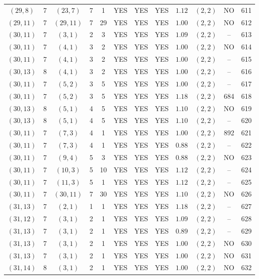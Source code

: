 \begin{longtable}{|c|c|c|c|c|c|c|c|c|c|c|c|}
$(29,8)$ & 7 & $(23,7)$ & 7 & 1 & YES & YES & YES & $1.12$ & $(2,2)$ & NO & 611\\
$(29,11)$ & 7 & $(29,11)$ & 7 & 29 & YES & YES & YES & $1.00$ & $(2,2)$ & NO & 612\\
$(30,11)$ & 7 & $(3,1)$ & 2 & 3 & YES & YES & YES & $1.09$ & $(2,2)$ & -- & 613\\
$(30,11)$ & 7 & $(4,1)$ & 3 & 2 & YES & YES & YES & $1.00$ & $(2,2)$ & NO & 614\\
$(30,11)$ & 7 & $(4,1)$ & 3 & 2 & YES & YES & YES & $1.00$ & $(2,2)$ & -- & 615\\
$(30,13)$ & 8 & $(4,1)$ & 3 & 2 & YES & YES & YES & $1.00$ & $(2,2)$ & -- & 616\\
$(30,11)$ & 7 & $(5,2)$ & 3 & 5 & YES & YES & YES & $1.00$ & $(2,2)$ & -- & 617\\
$(30,11)$ & 7 & $(5,2)$ & 3 & 5 & YES & YES & YES & $1.18$ & $(2,2)$ & 684 & 618\\
$(30,13)$ & 8 & $(5,1)$ & 4 & 5 & YES & YES & YES & $1.10$ & $(2,2)$ & NO & 619\\
$(30,13)$ & 8 & $(5,1)$ & 4 & 5 & YES & YES & YES & $1.10$ & $(2,2)$ & -- & 620\\
$(30,11)$ & 7 & $(7,3)$ & 4 & 1 & YES & YES & YES & $1.00$ & $(2,2)$ & 892 & 621\\
$(30,11)$ & 7 & $(7,3)$ & 4 & 1 & YES & YES & YES & $0.88$ & $(2,2)$ & -- & 622\\
$(30,11)$ & 7 & $(9,4)$ & 5 & 3 & YES & YES & YES & $0.88$ & $(2,2)$ & NO & 623\\
$(30,11)$ & 7 & $(10,3)$ & 5 & 10 & YES & YES & YES & $1.12$ & $(2,2)$ & -- & 624\\
$(30,11)$ & 7 & $(11,3)$ & 5 & 1 & YES & YES & YES & $1.12$ & $(2,2)$ & -- & 625\\
$(30,11)$ & 7 & $(30,11)$ & 7 & 30 & YES & YES & YES & $1.10$ & $(2,2)$ & NO & 626\\
$(31,13)$ & 7 & $(2,1)$ & 1 & 1 & YES & YES & YES & $1.18$ & $(2,2)$ & -- & 627\\
$(31,12)$ & 7 & $(3,1)$ & 2 & 1 & YES & YES & YES & $1.09$ & $(2,2)$ & -- & 628\\
$(31,13)$ & 7 & $(3,1)$ & 2 & 1 & YES & YES & YES & $0.89$ & $(2,2)$ & -- & 629\\
$(31,13)$ & 7 & $(3,1)$ & 2 & 1 & YES & YES & YES & $1.00$ & $(2,2)$ & NO & 630\\
$(31,13)$ & 7 & $(3,1)$ & 2 & 1 & YES & YES & YES & $1.00$ & $(2,2)$ & NO & 631\\
$(31,14)$ & 8 & $(3,1)$ & 2 & 1 & YES & YES & YES & $1.00$ & $(2,2)$ & NO & 632\\

\end{longtable}
